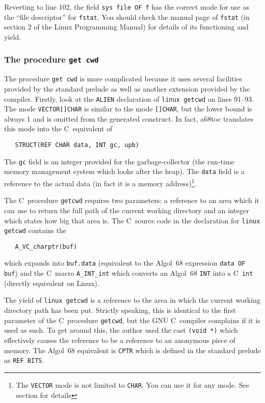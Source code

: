 Reverting to line 102, the field \verb|sys file OF f| has the correct
mode for use as the ``file descriptor'' for \verb|fstat|. You should
check the manual page of \verb|fstat| (in section 2 of the Linux
Programming Manual) for details of its functioning and yield.

\subsubsection{The procedure \texttt{get cwd}}
The procedure \verb|get cwd| is more complicated because it uses
several facilities provided by the standard prelude as well as
another extension provided by the
 compiler. Firstly, look at
the \verb|ALIEN| declaration of \verb|linux getcwd| on lines 91--93.
The mode \verb|VECTOR[]CHAR| is similar to the mode \verb|[]CHAR|,
but the lower bound is always 1 and is omitted from the generated
construct. In fact, a68toc translates this mode into the C~equivalent
of
\begin{verbatim}
   STRUCT(REF CHAR data, INT gc, upb)
\end{verbatim}
\noindent
The \verb|gc| field is an integer provided for the garbage-collector
(the run-time memory management system which looks after the heap).
The \verb|data| field is a reference to the actual data (in fact it
is a memory address)\footnote{The \texttt{VECTOR} mode is not limited
to \texttt{CHAR}. You can use it for any mode. See section
\protect{} for details}.

The C~procedure \verb|getcwd| requires two parameters: a reference to
an area which it can use to return the full path of the current working
directory and an integer which states how big that area is. The
C~source code in the declaration for \verb|linux getcwd| contains the
\begin{verbatim}
   A_VC_charptr(buf)
\end{verbatim}
\noindent
which expands into \verb|buf.data| (equivalent to the Algol~68
expression \verb|data OF buf|) and the C~macro \verb|A_INT_int| which
converts an Algol~68 \verb|INT| into a C~\verb|int| (directly
equivalent on Linux).

The yield of \verb|linux getcwd| is a reference to the area in which the
current working directory path has been put. Strictly speaking, this is
identical to the first parameter of the C~procedure \verb|getcwd|, but
the GNU C~compiler complains if it is used as such. To get around this,
the author used the cast \verb|(void *)| which effectively causes the
reference to be a reference to an anonymous piece of memory. The
Algol~68 equivalent is \verb|CPTR| which is defined in the standard
prelude as \verb|REF BITS|.

